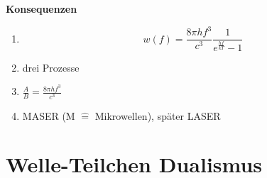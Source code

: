 \textbf{Konsequenzen}
\begin{enumerate}[1)]
		\item
		\begin{equation*}
		w(f) = \frac{8 \pi h f^3}{c^3} \frac{1}{e^{\frac{hf}{kT}}-1}
		\end{equation*}
		\item drei Prozesse
		\item $ \frac{A}{B} = \frac{8 \pi h f^3}{c^3} $
		\item MASER (M $ \widehat{=} $ Mikrowellen), später LASER
\end{enumerate}

\section{Welle-Teilchen Dualismus}

